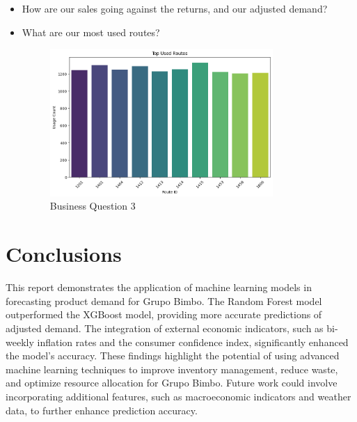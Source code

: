 \documentclass{article}
\begin{document}
\begin{itemize}
    \item How are our sales going against the returns, and our adjusted demand?



    \item What are our most used routes?

    \begin{figure}[H] 
        \begin{center}
        \centering
        \includegraphics[width=0.8\textwidth]{images/quest4.png}
        \caption{Business Question 3}
        \end{center}
    \end{figure}

\end{itemize}

\section{Conclusions}
This report demonstrates the application of machine learning models in forecasting product demand for Grupo Bimbo. The Random Forest model outperformed the XGBoost model, providing more accurate predictions of adjusted demand. The integration of external economic indicators, such as bi-weekly inflation rates and the consumer confidence index, significantly enhanced the model's accuracy. These findings highlight the potential of using advanced machine learning techniques to improve inventory management, reduce waste, and optimize resource allocation for Grupo Bimbo. Future work could involve incorporating additional features, such as macroeconomic indicators and weather data, to further enhance prediction accuracy.
\end{document}
